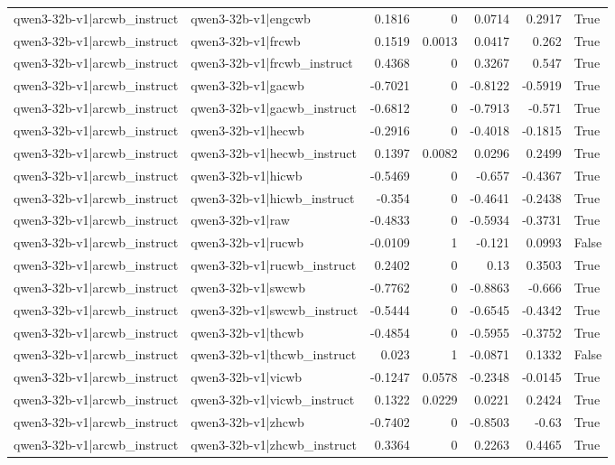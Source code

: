 \begin{table}
\begin{tabular}{l l r r r r l}
qwen3-32b-v1|arcwb_instruct & qwen3-32b-v1|engcwb & 0.1816 & 0 & 0.0714 & 0.2917 & True \\
qwen3-32b-v1|arcwb_instruct & qwen3-32b-v1|frcwb & 0.1519 & 0.0013 & 0.0417 & 0.262 & True \\
qwen3-32b-v1|arcwb_instruct & qwen3-32b-v1|frcwb_instruct & 0.4368 & 0 & 0.3267 & 0.547 & True \\
qwen3-32b-v1|arcwb_instruct & qwen3-32b-v1|gacwb & -0.7021 & 0 & -0.8122 & -0.5919 & True \\
qwen3-32b-v1|arcwb_instruct & qwen3-32b-v1|gacwb_instruct & -0.6812 & 0 & -0.7913 & -0.571 & True \\
qwen3-32b-v1|arcwb_instruct & qwen3-32b-v1|hecwb & -0.2916 & 0 & -0.4018 & -0.1815 & True \\
qwen3-32b-v1|arcwb_instruct & qwen3-32b-v1|hecwb_instruct & 0.1397 & 0.0082 & 0.0296 & 0.2499 & True \\
qwen3-32b-v1|arcwb_instruct & qwen3-32b-v1|hicwb & -0.5469 & 0 & -0.657 & -0.4367 & True \\
qwen3-32b-v1|arcwb_instruct & qwen3-32b-v1|hicwb_instruct & -0.354 & 0 & -0.4641 & -0.2438 & True \\
qwen3-32b-v1|arcwb_instruct & qwen3-32b-v1|raw & -0.4833 & 0 & -0.5934 & -0.3731 & True \\
qwen3-32b-v1|arcwb_instruct & qwen3-32b-v1|rucwb & -0.0109 & 1 & -0.121 & 0.0993 & False \\
qwen3-32b-v1|arcwb_instruct & qwen3-32b-v1|rucwb_instruct & 0.2402 & 0 & 0.13 & 0.3503 & True \\
qwen3-32b-v1|arcwb_instruct & qwen3-32b-v1|swcwb & -0.7762 & 0 & -0.8863 & -0.666 & True \\
qwen3-32b-v1|arcwb_instruct & qwen3-32b-v1|swcwb_instruct & -0.5444 & 0 & -0.6545 & -0.4342 & True \\
qwen3-32b-v1|arcwb_instruct & qwen3-32b-v1|thcwb & -0.4854 & 0 & -0.5955 & -0.3752 & True \\
qwen3-32b-v1|arcwb_instruct & qwen3-32b-v1|thcwb_instruct & 0.023 & 1 & -0.0871 & 0.1332 & False \\
qwen3-32b-v1|arcwb_instruct & qwen3-32b-v1|vicwb & -0.1247 & 0.0578 & -0.2348 & -0.0145 & True \\
qwen3-32b-v1|arcwb_instruct & qwen3-32b-v1|vicwb_instruct & 0.1322 & 0.0229 & 0.0221 & 0.2424 & True \\
qwen3-32b-v1|arcwb_instruct & qwen3-32b-v1|zhcwb & -0.7402 & 0 & -0.8503 & -0.63 & True \\
qwen3-32b-v1|arcwb_instruct & qwen3-32b-v1|zhcwb_instruct & 0.3364 & 0 & 0.2263 & 0.4465 & True \\

\end{tabular}
\end{table}
